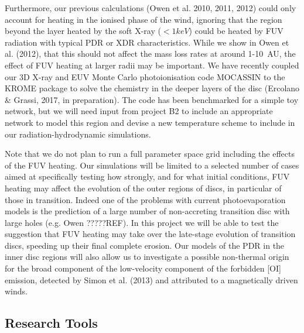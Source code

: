 \documentclass[10pt,fleqn,twoside]{article}
\begin{document}
Furthermore, our previous calculations (Owen et al. 2010, 2011, 2012)
could only account for heating 
in the ionised phase of the wind, ignoring that the region beyond the
layer heated by the soft X-ray ($<1keV$) could be heated by FUV
radiation with typical PDR or XDR characteristics. While we show in
Owen et al. (2012), that this should not affect the mass loss rates at
around 1-10~AU, the effect of FUV heating at larger radii may be
important. We have recently coupled our 3D X-ray and EUV Monte Carlo photoionisation
code MOCASSIN to the KROME package to solve the chemistry in the
deeper layers of the disc (Ercolano \& Grassi, 2017, in
preparation). The code has been benchmarked for a simple toy network,
but we will need input from project B2 to include an appropriate
network to model this region and devise a new temperature scheme to
include in our radiation-hydrodynamic simulations.   

Note that we do not plan to run a full
parameter space grid including the effects of the FUV heating. 
Our simulations will be limited to a selected number of cases
aimed at specifically testing how strongly, and for what initial
conditions, FUV heating may affect the evolution of the outer regions
of discs, in particular of those in transition. Indeed one of the
problems with current photoevaporation models is the prediction of a
large number of non-accreting transition disc with large holes
(e.g. Owen ?????REF). In this project we will be able to test the
suggestion that FUV heating may take over the late-stage evolution of
transition discs, speeding up their final complete erosion. Our models
of the PDR in the inner disc regions will also allow us to
investigate a possible non-thermal origin for the broad component of
the low-velocity component of the forbidden [OI] emission, detected by
Simon et al. (2013) and attributed to a magnetically driven winds.\\ 

\subsection{Research Tools}
\end{document}
